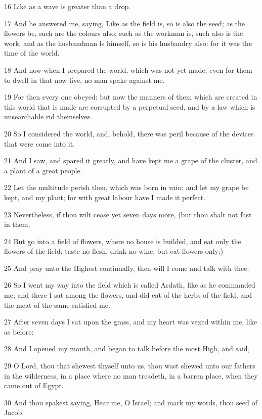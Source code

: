 \par 16 Like as a wave is greater than a drop.
\par 17 And he answered me, saying, Like as the field is, so is also the seed; as the flowers be, such are the colours also; such as the workman is, such also is the work; and as the husbandman ls himself, so is his husbandry also: for it was the time of the world.
\par 18 And now when I prepared the world, which was not yet made, even for them to dwell in that now live, no man spake against me.
\par 19 For then every one obeyed: but now the manners of them which are created in this world that is made are corrupted by a perpetual seed, and by a law which is unsearchable rid themselves.
\par 20 So I considered the world, and, behold, there was peril because of the devices that were come into it.
\par 21 And I saw, and spared it greatly, and have kept me a grape of the cluster, and a plant of a great people.
\par 22 Let the multitude perish then, which was born in vain; and let my grape be kept, and my plant; for with great labour have I made it perfect.
\par 23 Nevertheless, if thou wilt cease yet seven days more, (but thou shalt not fast in them,
\par 24 But go into a field of flowers, where no house is builded, and eat only the flowers of the field; taste no flesh, drink no wine, but eat flowers only;)
\par 25 And pray unto the Highest continually, then will I come and talk with thee.
\par 26 So I went my way into the field which is called Ardath, like as he commanded me; and there I sat among the flowers, and did eat of the herbs of the field, and the meat of the same satisfied me.
\par 27 After seven days I sat upon the grass, and my heart was vexed within me, like as before:
\par 28 And I opened my mouth, and began to talk before the most High, and said,
\par 29 O Lord, thou that shewest thyself unto us, thou wast shewed unto our fathers in the wilderness, in a place where no man treadeth, in a barren place, when they came out of Egypt.
\par 30 And thou spakest saying, Hear me, O Israel; and mark my words, thou seed of Jacob.
